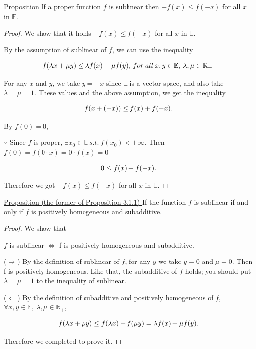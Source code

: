\documentclass[a4paper,11pt]{jsarticle}
\begin{document}
\begin{itembox}[l]{\underline{Proposition }}
  If a proper function $f$
  is sublinear then $-f(x) \leq f(-x)$ for all $x$ in $\mathbb{E}$.
\end{itembox}

\begin{proof}
  We show that it holds $-f(x) \leq f(-x)$ for all $x$ in $\mathbb{E}$.

  By the assumption of sublinear of $f$, we can use the inequality

  \begin{equation}
    f(\lambda x + \mu y) \leq \lambda f(x) + \mu f(y),\:for \:all\: x, y \in{\mathbb{E}},\: \lambda, \mu \in{\mathbb{R}}_+. \notag
  \end{equation}

  For any $x$ and $y$, we take $y=-x$ since ${\mathbb{E}}$ is a vector space, and also take $\lambda=\mu=1$. These values and the above assumption, we get the inequality

  \begin{equation}
    f(x + (-x)) \leq f(x) + f(-x). \notag
  \end{equation}

  By $f(0) = 0$,

  $\because$ Since $f$ is proper, $\exists x_0 \in \mathbb{E} \:s.t.\: f(x_0) < +\infty$. Then $f(0) = f(0 \cdot x) = 0 \cdot f(x) = 0$


  \begin{equation}
    0 \leq f(x) + f(-x). \notag
  \end{equation}

  Therefore we got $-f(x) \leq f(-x)$ for all $x$ in $\mathbb{E}$.
\end{proof}

\begin{itembox}[l]{\underline{Proposition (the former of Proposition 3.1.1) }}
  If the function $f$ is sublinear if and only if $f$ is positively homogeneous and subadditive.
\end{itembox}

\begin{proof}
  We show that

  \begin{center}
    $f$ is sublinear $\Leftrightarrow$ f is positively homogeneous and subadditive.
  \end{center}

  ($\Rightarrow$) By the definition of sublinear of $f$, for any $y$ we take $y=0$ and $\mu=0$. Then f is positively homogeneous. Like that, the subadditive of $f$ holds; you should put $\lambda=\mu=1$ to the inequality of sublinear.

  ($\Leftarrow$) By the definition of subadditive and positively homogeneous of $f$, $\forall x, y \in{\mathbb{E}},\: \lambda, \mu \in{\mathbb{R}}_+$,

  \begin{equation}
    f(\lambda x + \mu y) \leq f(\lambda x) + f(\mu y) = \lambda f(x) + \mu f(y) . \notag
  \end{equation}

  Therefore we completed to prove it.
\end{proof}
\end{document}

